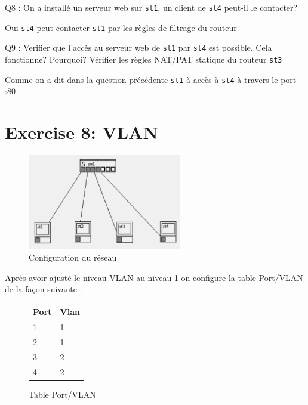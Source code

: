 \documentclass[11pt, openright]{book}
\begin{document}
\begin{dent}{Q8 :} On a installé un serveur web sur \texttt{st1}, un client de \texttt{st4} peut-il le contacter?
	
	Oui \texttt{st4} peut contacter \texttt{st1} par les règles de filtrage du routeur
	
\end{dent}

\begin{dent}{Q9 :} Verifier que l'accès au serveur web de \texttt{st1} par \texttt{st4} est possible. Cela fonctionne? Pourquoi? Vérifier les règles NAT/PAT statique du routeur \texttt{st3}
	
	Comme on a dit dans la question précédente \texttt{st1} à accès à \texttt{st4} à travers le port :80 
	
\end{dent}

\section{Exercise 8: VLAN}

\begin{figure}[ht!]
	\centering
	\includegraphics[width=0.6\textwidth]{./object/g3.png}
	\caption{Configuration du réseau}
\end{figure}

Après avoir ajusté le niveau VLAN au niveau 1 on configure la table Port/VLAN de la façon suivante :

\begin{figure}[ht!]
	\begin{tabular}{|l|l|}
		\hline
		Port & Vlan \\
		\hline
		1    & 1    \\
		2    & 1    \\
		3    & 2    \\
		4    & 2    \\
		\hline
	\end{tabular}
	\caption{Table Port/VLAN}
\end{figure}
\end{document}
